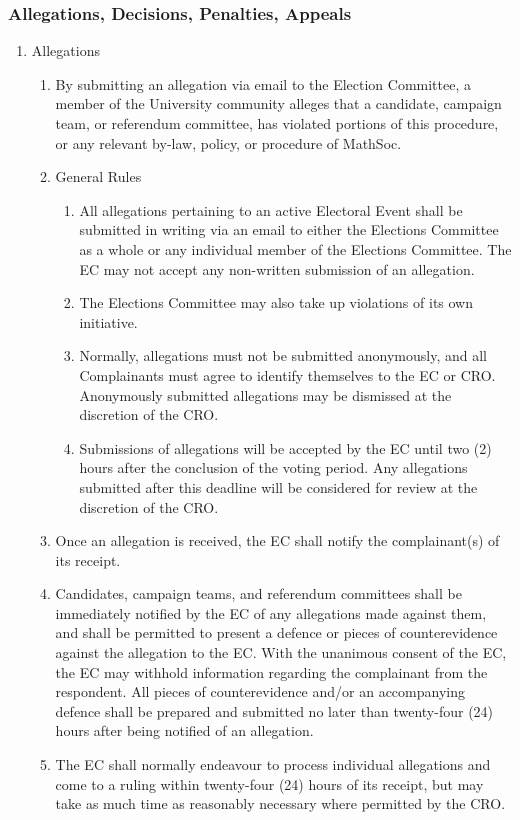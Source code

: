 \subsubsection{Allegations, Decisions, Penalties, Appeals}
\begin{enumerate}
	\item Allegations
		\begin{enumerate}
			\item By submitting an allegation via email to the Election Committee, a member of the University community alleges that a candidate, campaign team, or referendum committee, has violated portions of this procedure, or any relevant by-law, policy, or procedure of MathSoc.
			\item General Rules 
				\begin{enumerate}
					\item All allegations pertaining to an active Electoral Event shall be submitted in writing via an email to either the Elections Committee as a whole or any individual member of the Elections Committee. The EC may not accept any non-written submission of an allegation.
					\item The Elections Committee may also take up violations of its own initiative.
					\item Normally, allegations must not be submitted anonymously, and all Complainants must agree to identify themselves to the EC or CRO. Anonymously submitted allegations may be dismissed at the discretion of the CRO.
					\item Submissions of allegations will be accepted by the EC until two (2) hours after the conclusion of the voting period. Any allegations submitted after this deadline will be considered for review at the discretion of the CRO.
				\end{enumerate}
			\item Once an allegation is received, the EC shall notify the complainant(s) of its receipt.
			\item Candidates, campaign teams, and referendum committees shall be immediately notified by the EC of any allegations made against them, and shall be permitted to present a defence or pieces of counterevidence against the allegation to the EC. With the unanimous consent of the EC, the EC may withhold information regarding the complainant from the respondent. All pieces of counterevidence and/or an accompanying defence shall be prepared and submitted no later than twenty-four (24) hours after being notified of an allegation.
			\item The EC shall normally endeavour to process individual allegations and come to a ruling within twenty-four (24) hours of its receipt, but may take as much time as reasonably necessary where permitted by the CRO.

\end{enumerate}
\end{enumerate}
